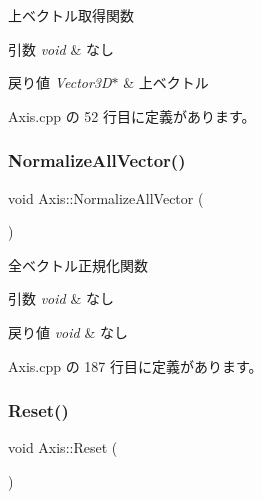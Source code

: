 上ベクトル取得関数 


\begin{DoxyParams}{引数}
{\em void} & なし \\
\hline
\end{DoxyParams}

\begin{DoxyRetVals}{戻り値}
{\em Vector3\+D$\ast$} & 上ベクトル \\
\hline
\end{DoxyRetVals}


 Axis.\+cpp の 52 行目に定義があります。

\mbox{\label{class_axis_a2f996a45ce7884ae66ced29c33e9e2fb}} 
\subsubsection{\texorpdfstring{Normalize\+All\+Vector()}{NormalizeAllVector()}}
{\footnotesize\ttfamily void Axis\+::\+Normalize\+All\+Vector (\begin{DoxyParamCaption}{ }\end{DoxyParamCaption})\hspace{0.3cm}{\ttfamily [private]}}



全ベクトル正規化関数 


\begin{DoxyParams}{引数}
{\em void} & なし \\
\hline
\end{DoxyParams}

\begin{DoxyRetVals}{戻り値}
{\em void} & なし \\
\hline
\end{DoxyRetVals}


 Axis.\+cpp の 187 行目に定義があります。

\mbox{\label{class_axis_a2ccc5c19d05f0c9096c6a3e14af2de8f}} 
\subsubsection{\texorpdfstring{Reset()}{Reset()}}
{\footnotesize\ttfamily void Axis\+::\+Reset (\begin{DoxyParamCaption}{ }\end{DoxyParamCaption})}




